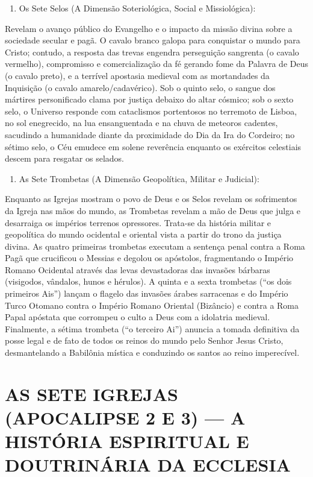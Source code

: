\begin{enumerate}
  \item Os Sete Selos (A Dimensão Soteriológica, Social e Missiológica):
\end{enumerate}

Revelam o avanço público do Evangelho e o impacto da missão divina sobre a sociedade secular e pagã. O cavalo branco galopa para conquistar o mundo para Cristo; contudo, a resposta das trevas engendra perseguição sangrenta (o cavalo vermelho), compromisso e comercialização da fé gerando fome da Palavra de Deus (o cavalo preto), e a terrível apostasia medieval com as mortandades da Inquisição (o cavalo amarelo/cadavérico). Sob o quinto selo, o sangue dos mártires personificado clama por justiça debaixo do altar cósmico; sob o sexto selo, o Universo responde com cataclismos portentosos no terremoto de Lisboa, no sol enegrecido, na lua ensanguentada e na chuva de meteoros cadentes, sacudindo a humanidade diante da proximidade do Dia da Ira do Cordeiro; no sétimo selo, o Céu emudece em solene reverência enquanto os exércitos celestiais descem para resgatar os selados.

\begin{enumerate}
  \item As Sete Trombetas (A Dimensão Geopolítica, Militar e Judicial):
\end{enumerate}

Enquanto as Igrejas mostram o povo de Deus e os Selos revelam os sofrimentos da Igreja nas mãos do mundo, as Trombetas revelam a mão de Deus que julga e desarraiga os impérios terrenos opressores. Trata-se da história militar e geopolítica do mundo ocidental e oriental vista a partir do trono da justiça divina. As quatro primeiras trombetas executam a sentença penal contra a Roma Pagã que crucificou o Messias e degolou os apóstolos, fragmentando o Império Romano Ocidental através das levas devastadoras das invasões bárbaras (visigodos, vândalos, hunos e hérulos). A quinta e a sexta trombetas (``os dois primeiros Ais'') lançam o flagelo das invasões árabes sarracenas e do Império Turco Otomano contra o Império Romano Oriental (Bizâncio) e contra a Roma Papal apóstata que corrompeu o culto a Deus com a idolatria medieval. Finalmente, a sétima trombeta (``o terceiro Ai'') anuncia a tomada definitiva da posse legal e de fato de todos os reinos do mundo pelo Senhor Jesus Cristo, desmantelando a Babilônia mística e conduzindo os santos ao reino imperecível.


\section{AS SETE IGREJAS (APOCALIPSE 2 E 3) — A HISTÓRIA ESPIRITUAL E DOUTRINÁRIA DA ECCLESIA}



